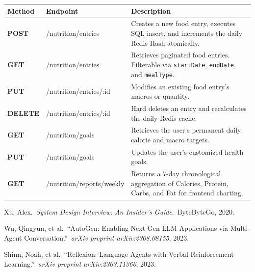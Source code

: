\documentclass[11pt,a4paper,twoside]{article}
\begin{document}
\begin{table}[H]
\centering
\begin{tabularx}{\textwidth}{>{\bfseries\sffamily}p{16mm} >{\ttfamily\small}p{53mm} Y}
\toprule
Method & Endpoint & Description \\
\midrule
POST & /nutrition/entries & Creates a new food entry, executes SQL insert, and increments the daily Redis Hash atomically. \\
GET & /nutrition/entries & Retrieves paginated food entries. Filterable via \texttt{startDate}, \texttt{endDate}, and \texttt{mealType}. \\
PUT & /nutrition/entries/:id & Modifies an existing food entry's macros or quantity. \\
DELETE & /nutrition/entries/:id & Hard deletes an entry and recalculates the daily Redis cache. \\
GET & /nutrition/goals & Retrieves the user's permanent daily calorie and macro targets. \\
PUT & /nutrition/goals & Updates the user's customized health goals. \\
GET & /nutrition/reports/weekly & Returns a 7-day chronological aggregation of Calories, Protein, Carbs, and Fat for frontend charting. \\
\bottomrule
\end{tabularx}
\end{table}

\begin{thebibliography}{9}
\small

Xu, Alex.\
\textit{System Design Interview: An Insider's Guide}.\
ByteByteGo, 2020.

Wu, Qingyun, et al.\
``AutoGen: Enabling Next-Gen LLM Applications via Multi-Agent Conversation.''\
\textit{arXiv preprint arXiv:2308.08155}, 2023.

Shinn, Noah, et al.\
``Reflexion: Language Agents with Verbal Reinforcement Learning.''\
\textit{arXiv preprint arXiv:2303.11366}, 2023.

\end{thebibliography}
\end{document}
